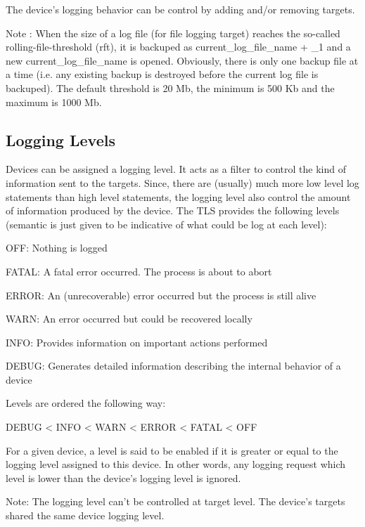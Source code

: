 The device's logging behavior can be control by adding and/or removing
targets.

Note : When the size of a log file (for file logging target) reaches
the so-called rolling-file-threshold (rft), it is backuped as \textquotedbl{}current\_log\_file\_name\textquotedbl{}
+ \textquotedbl{}\_1\textquotedbl{} and a new \textquotedbl{}current\_log\_file\_name\textquotedbl{}
is opened. Obviously, there is only one backup file at a time (i.e.
any existing backup is destroyed before the current log file is backuped).
The default threshold is 20 Mb, the minimum is 500 Kb and the maximum
is 1000 Mb.


\subsection{Logging Levels}

Devices can be assigned a logging level. It acts as a filter to control
the kind of information sent to the targets. Since, there are (usually)
much more low level log statements than high level statements, the
logging level also control the amount of information produced by the
device. The TLS provides the following levels (semantic is just given
to be indicative of what could be log at each level):

OFF: Nothing is logged

FATAL: A fatal error occurred. The process is about to abort

ERROR: An (unrecoverable) error occurred but the process is still
alive

WARN: An error occurred but could be recovered locally

INFO: Provides information on important actions performed

DEBUG: Generates detailed information describing the internal behavior
of a device

Levels are ordered the following way: \begin{center}DEBUG < INFO
< WARN < ERROR < FATAL < OFF\end{center}

For a given device, a level is said to be enabled if it is greater
or equal to the logging level assigned to this device. In other words,
any logging request which level is lower than the device's logging
level is ignored. 

Note: The logging level can't be controlled at target level. The device's
targets shared the same device logging level.


